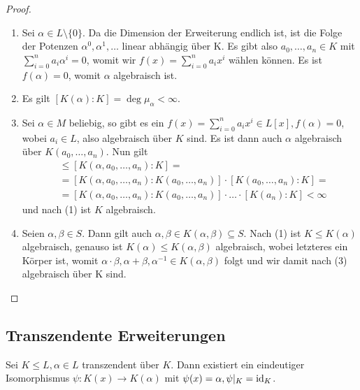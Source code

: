 \begin{proof}{\ }
    \begin{enumerate}
        \item Sei $\alpha \in L \setminus \{0\}$. Da die Dimension der Erweiterung endlich ist, ist die Folge der Potenzen $\alpha^0, \alpha^1, \hdots$ linear abhängig über K. Es gibt also $a_0, \hdots, a_n \in K$ mit $\sum_{i=0}^n a_i \alpha^i = 0$, womit wir $f(x) = \sum_{i=0}^n a_i x^i$ wählen können. Es ist $f(\alpha) = 0$, womit $\alpha$ algebraisch ist.
        
        \item Es gilt $[K(\alpha) : K] = \deg \mu_\alpha < \infty$.
        
        \item Sei $\alpha \in M$ beliebig, so gibt es ein $f(x) = \sum_{i=0}^n a_i x^i \in L[x], f(\alpha) = 0$, wobei $a_i \in L$, also algebraisch über $K$ sind. Es ist dann auch $\alpha$ algebraisch über $K(a_0, \hdots, a_n)$. Nun gilt
        \begin{align*}
            [K(\alpha) : K] &\leq [K(\alpha, a_0, \hdots, a_n) : K] = \\
            &= [K(\alpha, a_0, \hdots, a_n) : K(a_0, \hdots, a_n)] \cdot [K(a_0, \hdots, a_n) : K] = \\
            &= [K(\alpha, a_0, \hdots, a_n) : K(a_0, \hdots, a_n)] \cdot \hdots \cdot [K(a_n) : K] < \infty
        \end{align*}
        und nach (1) ist $K$ algebraisch.

        \item Seien $\alpha, \beta \in S$. Dann gilt auch $\alpha, \beta \in K(\alpha, \beta) \subseteq S$. Nach (1) ist $K \leq K(\alpha)$ algebraisch, genauso ist $K(\alpha) \leq K(\alpha, \beta)$ algebraisch, wobei letzteres ein Körper ist, womit $\alpha \cdot \beta, \alpha + \beta, \alpha^{-1} \in K(\alpha, \beta)$ folgt und wir damit nach (3) algebraisch über K sind.
    \end{enumerate}
\end{proof}

\subsection{Transzendente Erweiterungen}

\begin{proposition}
    Sei $K \leq L, \alpha \in L$ transzendent über $K$. Dann existiert ein eindeutiger Isomorphismus $\psi : K(x) \to K(\alpha)$ mit $\psi(x) = \alpha, \psi \vert_K = \operatorname{id}_K$.
\end{proposition}

